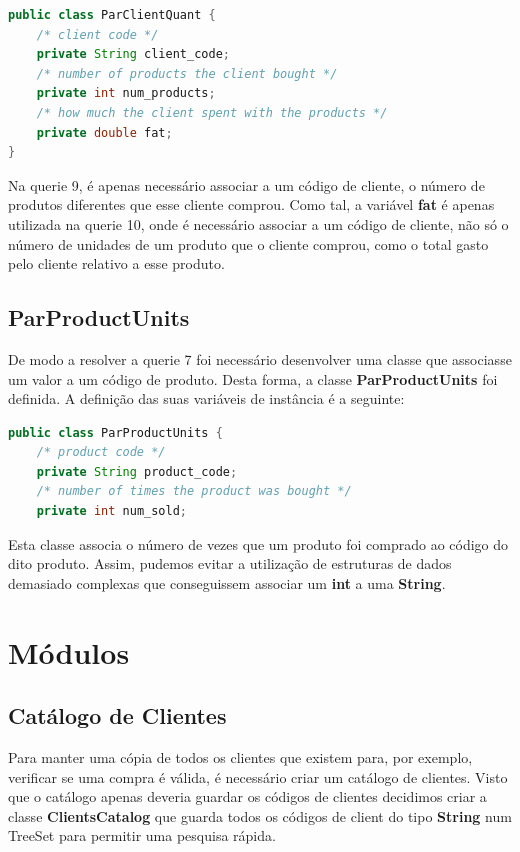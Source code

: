 \documentclass[10pt] {article}
\begin{document}
\begin{lstlisting}[language=Java]
public class ParClientQuant {
    /* client code */
	private String client_code;
	/* number of products the client bought */
    private int num_products;
    /* how much the client spent with the products */
    private double fat;
}
\end{lstlisting}

\par Na querie 9, é apenas necessário associar a um código de cliente, o número de produtos diferentes que esse cliente
comprou. Como tal, a variável \textbf{fat} é apenas utilizada na querie 10, onde é necessário associar a um código de
cliente, não só o número de unidades de um produto que o cliente comprou, como o total gasto pelo cliente relativo a esse
produto.

\subsection{ParProductUnits}
\par De modo a resolver a querie 7 foi necessário desenvolver uma classe que associasse um valor a um código de produto.
Desta forma, a classe \textbf{ParProductUnits} foi definida. A definição das suas variáveis de instância é a seguinte:

\begin{lstlisting}[language=Java]
public class ParProductUnits {
	/* product code */
    private String product_code;
    /* number of times the product was bought */
    private int num_sold;
\end{lstlisting}

\par Esta classe associa o número de vezes que um produto foi comprado ao código do dito produto. Assim, pudemos evitar
a utilização de estruturas de dados demasiado complexas que conseguissem associar um \textbf{int} a uma \textbf{String}.

\newpage
\section{Módulos}
\subsection{Catálogo de Clientes}
\par Para manter uma cópia de todos os clientes que existem para, por exemplo, verificar se uma compra é válida, é necessário 
criar um catálogo de clientes. Visto que o catálogo apenas deveria guardar os códigos de clientes decidimos criar a classe 
\textbf{ClientsCatalog} que guarda todos os códigos de client do tipo \textbf{String} num TreeSet para permitir uma pesquisa 
rápida.
\end{document}
